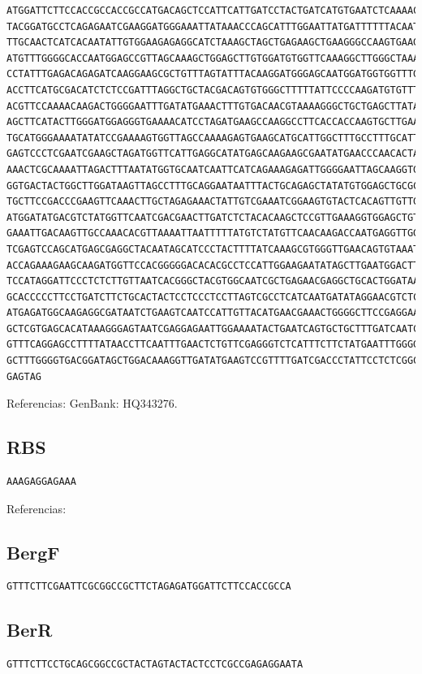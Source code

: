 \documentclass[12pt]{article}
\begin{document}
\begin{verbatim}
ATGGATTCTTCCACCGCCACCGCCATGACAGCTCCATTCATTGATCCTACTGATCATGTGAATCTCAAAACTGA
TACGGATGCCTCAGAGAATCGAAGGATGGGAAATTATAAACCCAGCATTTGGAATTATGATTTTTTACAATCAC
TTGCAACTCATCACAATATTGTGGAAGAGAGGCATCTAAAGCTAGCTGAGAAGCTGAAGGGCCAAGTGAAGTTT
ATGTTTGGGGCACCAATGGAGCCGTTAGCAAAGCTGGAGCTTGTGGATGTGGTTCAAAGGCTTGGGCTAAACCA
CCTATTTGAGACAGAGATCAAGGAAGCGCTGTTTAGTATTTACAAGGATGGGAGCAATGGATGGTGGTTTGGCC
ACCTTCATGCGACATCTCTCCGATTTAGGCTGCTACGACAGTGTGGGCTTTTTATTCCCCAAGATGTGTTTAAA
ACGTTCCAAAACAAGACTGGGGAATTTGATATGAAACTTTGTGACAACGTAAAAGGGCTGCTGAGCTTATATGA
AGCTTCATACTTGGGATGGAGGGTGAAAACATCCTAGATGAAGCCAAGGCCTTCACCACCAAGTGCTTGAAAAG
TGCATGGGAAAATATATCCGAAAAGTGGTTAGCCAAAAGAGTGAAGCATGCATTGGCTTTGCCTTTGCATTGGA
GAGTCCCTCGAATCGAAGCTAGATGGTTCATTGAGGCATATGAGCAAGAAGCGAATATGAACCCAACACTACTC
AAACTCGCAAAATTAGACTTTAATATGGTGCAATCAATTCATCAGAAAGAGATTGGGGAATTAGCAAGGTGGTG
GGTGACTACTGGCTTGGATAAGTTAGCCTTTGCAGGAATAATTTACTGCAGAGCTATATGTGGAGCTGCGCGAT
TGCTTCCGACCCGAAGTTCAAACTTGCTAGAGAAACTATTGTCGAAATCGGAAGTGTACTCACAGTTGTTGACG
ATGGATATGACGTCTATGGTTCAATCGACGAACTTGATCTCTACACAAGCTCCGTTGAAAGGTGGAGCTGTGTG
GAAATTGACAAGTTGCCAAACACGTTAAAATTAATTTTTATGTCTATGTTCAACAAGACCAATGAGGTTGGCCT
TCGAGTCCAGCATGAGCGAGGCTACAATAGCATCCCTACTTTTATCAAAGCGTGGGTTGAACAGTGTAAATCAT
ACCAGAAAGAAGCAAGATGGTTCCACGGGGGACACACGCCTCCATTGGAAGAATATAGCTTGAATGGACTTGTT
TCCATAGGATTCCCTCTCTTGTTAATCACGGGCTACGTGGCAATCGCTGAGAACGAGGCTGCACTGGATAAAGT
GCACCCCCTTCCTGATCTTCTGCACTACTCCTCCCTCCTTAGTCGCCTCATCAATGATATAGGAACGTCTCCGG
ATGAGATGGCAAGAGGCGATAATCTGAAGTCAATCCATTGTTACATGAACGAAACTGGGGCTTCCGAGGAAGTT
GCTCGTGAGCACATAAAGGGAGTAATCGAGGAGAATTGGAAAATACTGAATCAGTGCTGCTTTGATCAATCTCA
GTTTCAGGAGCCTTTTATAACCTTCAATTTGAACTCTGTTCGAGGGTCTCATTTCTTCTATGAATTTGGGGATG
GCTTTGGGGTGACGGATAGCTGGACAAAGGTTGATATGAAGTCCGTTTTGATCGACCCTATTCCTCTCGGCGAG
GAGTAG
\end{verbatim}

Referencias: GenBank: HQ343276.

\subsection{RBS}

\begin{verbatim}
AAAGAGGAGAAA
\end{verbatim}

Referencias: \cite{igemP}

\subsection{BergF}

\begin{verbatim}
GTTTCTTCGAATTCGCGGCCGCTTCTAGAGATGGATTCTTCCACCGCCA
\end{verbatim}

\subsection{BerR}

\begin{verbatim}
GTTTCTTCCTGCAGCGGCCGCTACTAGTACTACTCCTCGCCGAGAGGAATA
\end{verbatim}



\end{document}
